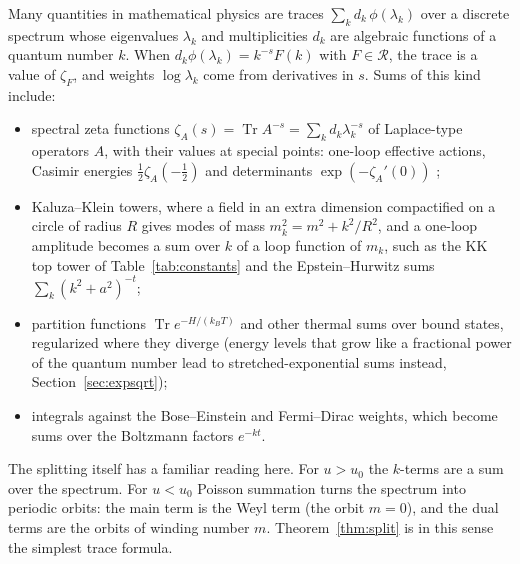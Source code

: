 \documentclass[11pt,reqno]{amsart}
\theoremstyle{definition}
\theoremstyle{remark}
\newcommand{\Reg}{\mathcal{R}}
\begin{document}
Many quantities in mathematical physics are traces $\sum_kd_k\,\phi(\lambda_k)$ over a discrete spectrum whose
eigenvalues $\lambda_k$ and multiplicities $d_k$ are algebraic functions of a quantum number $k$. When
$d_k\phi(\lambda_k) = k^{-s}F(k)$ with $F \in \Reg$, the trace is a value of $\zeta_F$, and weights $\log\lambda_k$
come from derivatives in $s$. Sums of this kind include:
\begin{itemize}
\item spectral zeta functions $\zeta_A(s) = \operatorname{Tr}A^{-s} = \sum_kd_k\lambda_k^{-s}$ of Laplace-type operators $A$, with
their values at special points: one-loop effective actions, Casimir energies $\frac12\zeta_A(-\frac12)$ and
determinants $\exp(-\zeta_A'(0))$ \cite{Eli95,Kir02};
\item Kaluza--Klein towers, where a field in an extra dimension compactified on a circle of radius $R$ gives modes of mass
$m_k^2 = m^2 + k^2/R^2$, and a one-loop amplitude becomes a sum over $k$ of a loop function of $m_k$, such as the KK top
tower of Table~\ref{tab:constants} \cite{Pet02} and the Epstein--Hurwitz sums $\sum_k(k^2+a^2)^{-t}$;
\item partition functions $\operatorname{Tr}e^{-H/(k_BT)}$ and other thermal sums over bound states, regularized where
they diverge (energy levels that grow like a fractional power of the quantum number lead to stretched-exponential sums
instead, Section~\ref{sec:expsqrt});
\item integrals against the Bose--Einstein and Fermi--Dirac weights, which become sums over the Boltzmann factors
$e^{-kt}$.
\end{itemize}
The splitting itself has a familiar reading here. For $u > u_0$ the $k$-terms are a sum over the spectrum. For $u < u_0$
Poisson summation turns the spectrum into periodic orbits: the main term is the Weyl term (the orbit $m = 0$), and the
dual terms are the orbits of winding number $m$. Theorem~\ref{thm:split} is in this sense the simplest trace formula.
\end{document}

